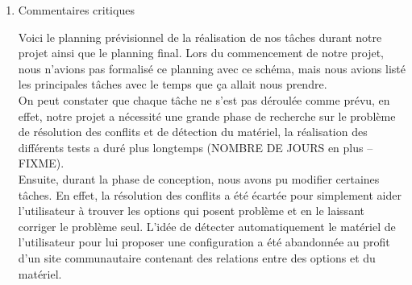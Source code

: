 ﻿\documentclass[16pts]{report}
\begin{document}
\begin{enumerate}




	

	\item Commentaires critiques

	Voici le planning prévisionnel de la réalisation de nos tâches durant 
	notre projet ainsi que le planning final. Lors du commencement de notre 
	projet, nous n'avions pas formalisé ce planning avec ce schéma, mais nous 
	avions listé les principales tâches avec le temps que ça allait 
	nous prendre.
	\\
	On peut constater que chaque tâche ne s'est pas déroulée comme prévu, 
	en effet, notre projet a nécessité une grande phase de recherche sur le 
	problème de résolution des conflits et de détection du matériel, la 
	réalisation des différents tests a duré plus longtemps 
	(NOMBRE DE JOURS en plus -- FIXME).
	\\
	Ensuite, durant la phase de conception, nous avons pu modifier 
	certaines tâches. En effet, la résolution des conflits a été écartée pour simplement aider l'utilisateur à trouver les options qui posent	problème et en le laissant corriger le problème seul. L'idée de détecter 
	automatiquement le matériel de l'utilisateur pour lui proposer une 
	configuration a été abandonnée au profit d'un site communautaire 
	contenant des relations entre des options et du matériel.



\end{enumerate}
\end{document}

